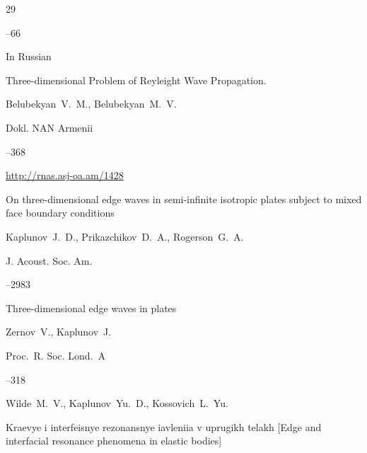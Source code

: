 \begin{thebibliography}{29}


–66





\lang In Russian

\paper Three-dimensional Problem of Reyleight Wave Propagation.

\by  Belubekyan~V.~M., Belubekyan~M.~V.

\jour Dokl. NAN Armenii




--368

\elink \url{http://rnas.asj-oa.am/1428}




\paper On three-dimensional edge waves in semi-infinite isotropic plates subject to mixed face boundary conditions

\by Kaplunov~J.~D., Prikazchikov~D.~A., Rogerson~G.~A.

\jour J. Acoust. Soc. Am.




–2983





\paper Three-dimensional edge waves in plates

\by Zernov~V., Kaplunov~J.

\jour Proc.~R. Soc. Lond.~A



--318





\by Wilde~M.~V., Kaplunov~Yu.~D., Kossovich~L.~Yu.

\book Kraevye i interfeisnye rezonansnye iavleniia v uprugikh telakh \rm [Edge and interfacial resonance phenomena in elastic bodies]


\end{thebibliography}
